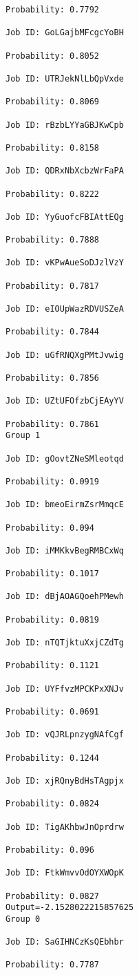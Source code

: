 \documentclass[11pt]{article}
\begin{document}
\begin{Verbatim}[commandchars=\\\{\}]
Probability: 0.7792

Job ID: GoLGajbMFcgcYoBH

Probability: 0.8052

Job ID: UTRJekNlLbQpVxde

Probability: 0.8069

Job ID: rBzbLYYaGBJKwCpb

Probability: 0.8158

Job ID: QDRxNbXcbzWrFaPA

Probability: 0.8222

Job ID: YyGuofcFBIAttEQg

Probability: 0.7888

Job ID: vKPwAueSoDJzlVzY

Probability: 0.7817

Job ID: eIOUpWazRDVUSZeA

Probability: 0.7844

Job ID: uGfRNQXgPMtJvwig

Probability: 0.7856

Job ID: UZtUFOfzbCjEAyYV

Probability: 0.7861
Group 1

Job ID: gOovtZNeSMleotqd

Probability: 0.0919

Job ID: bmeoEirmZsrMmqcE

Probability: 0.094

Job ID: iMMKkvBegRMBCxWq

Probability: 0.1017

Job ID: dBjAOAGQoehPMewh

Probability: 0.0819

Job ID: nTQTjktuXxjCZdTg

Probability: 0.1121

Job ID: UYFfvzMPCKPxXNJv

Probability: 0.0691

Job ID: vQJRLpnzygNAfCgf

Probability: 0.1244

Job ID: xjRQnyBdHsTAgpjx

Probability: 0.0824

Job ID: TigAKhbwJnOprdrw

Probability: 0.096

Job ID: FtkWmvvOdOYXWOpK

Probability: 0.0827
Output=-2.1528022215857625
Group 0

Job ID: SaGIHNCzKsQEbhbr

Probability: 0.7787


\end{Verbatim}
\end{document}
